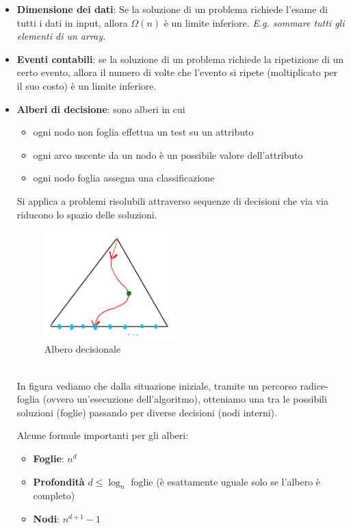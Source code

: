 \begin{itemize}
	\item \textbf{Dimensione dei dati}: Se la soluzione di un problema richiede l'esame di tutti i dati in input, allora $\Omega(n)$ è un limite inferiore. \emph{E.g. sommare tutti gli elementi di un array.}
	\item \textbf{Eventi contabili}: se la soluzione di un problema richiede la ripetizione di un certo evento, allora il numero di volte che l'evento si ripete (moltiplicato per il suo costo) è un limite inferiore.
	\item \textbf{Alberi di decisione}: sono alberi in cui
	\begin{itemize}
		\item ogni nodo non foglia effettua un test su un attributo
		\item ogni arco uscente da un nodo è un possibile valore dell'attributo
		\item ogni nodo foglia assegna una classificazione
	\end{itemize}
	Si applica a problemi risolubili attraverso sequenze di decisioni che via via riducono lo spazio delle soluzioni.
	\begin{figure}[!h]
		\centering
		\includegraphics[width=5cm]{images/albero-decisionale.png}
		\caption{Albero decisionale}
	\end{figure}
	\\In figura vediamo che dalla situazione iniziale, tramite un \color{red} percorso radice-foglia \color{black} (ovvero un'esecuzione dell'algoritmo), otteniamo una tra le possibili \color{blue} soluzioni \color{black}  (foglie) passando per diverse \color{green} decisioni \color{black} (nodi interni).
	\begin{note}
		Alcune formule importanti per gli alberi:
		\begin{itemize}
			\item  \textbf{Foglie}: $n^d$
			\item \textbf{Profondità} $d \leq \log_n$ foglie (è esattamente uguale solo se l'albero è completo)
			\item \textbf{Nodi}: $n^{d+1}-1$			

\end{itemize}
\end{note}
\end{itemize}
